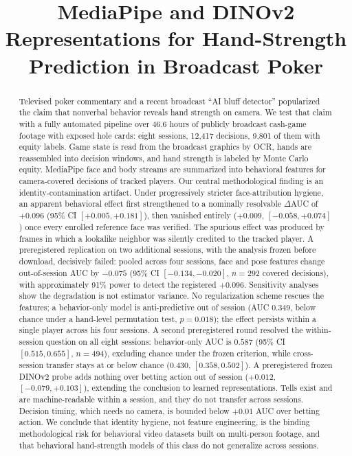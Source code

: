 \documentclass[conference]{IEEEtran}
\title{MediaPipe and DINOv2 Representations for Hand-Strength Prediction in Broadcast Poker}
\author{\IEEEauthorblockN{Minu Choi}
\IEEEauthorblockA{School of Data Science\\
University of Virginia\\
Charlottesville, VA\\
qce2dp@virginia.edu}}
\begin{document}
\maketitle

\begin{abstract}
Televised poker commentary and a recent broadcast ``AI bluff detector''
popularized the claim that nonverbal behavior reveals hand strength on
camera. We test that claim with a fully automated pipeline over 46.6 hours
of publicly broadcast cash-game footage with exposed hole cards: eight
sessions, 12{,}417 decisions, 9{,}801 of them with equity labels. Game
state is read from the broadcast graphics by OCR, hands are reassembled
into decision windows, and hand strength is labeled by Monte Carlo equity.
MediaPipe face and body streams are summarized into behavioral features
for camera-covered decisions of tracked players. Our central
methodological finding is an identity-contamination artifact. Under
progressively stricter face-attribution hygiene, an apparent behavioral
effect first strengthened to a nominally resolvable $\Delta$AUC of
$+0.096$ (95\% CI $[+0.005, +0.181]$), then vanished entirely ($+0.009$,
$[-0.058, +0.074]$) once every enrolled reference face was verified. The
spurious effect was produced by frames in which a lookalike neighbor was
silently credited to the tracked player. A preregistered replication on
two additional sessions, with the analysis frozen before download,
decisively failed: pooled across four sessions, face and pose features
change out-of-session AUC by $-0.075$ (95\% CI $[-0.134, -0.020]$,
$n=292$ covered decisions), with approximately 91\% power to detect the
registered $+0.096$. Sensitivity analyses show the degradation is not
estimator variance. No regularization scheme rescues the features; a
behavior-only model is anti-predictive out of session (AUC $0.349$, below
chance under a hand-level permutation test, $p = 0.018$); the effect
persists within a single player across his four sessions. A second
preregistered round resolved the within-session question on all eight
sessions: behavior-only AUC is $0.587$ (95\% CI $[0.515, 0.655]$,
$n=494$), excluding chance under the frozen criterion, while
cross-session transfer stays at or below chance ($0.430$,
$[0.358, 0.502]$). A preregistered frozen DINOv2 probe adds nothing over
betting action out of session ($+0.012$, $[-0.079, +0.103]$), extending
the conclusion to learned representations. Tells exist and are
machine-readable within a session, and they do not transfer across
sessions. Decision timing, which needs no camera, is bounded below
$+0.01$ AUC over betting action. We conclude that identity hygiene, not
feature engineering, is the binding methodological risk for behavioral
video datasets built on multi-person footage, and that behavioral
hand-strength models of this class do not generalize across sessions.
\end{abstract}
\end{document}

